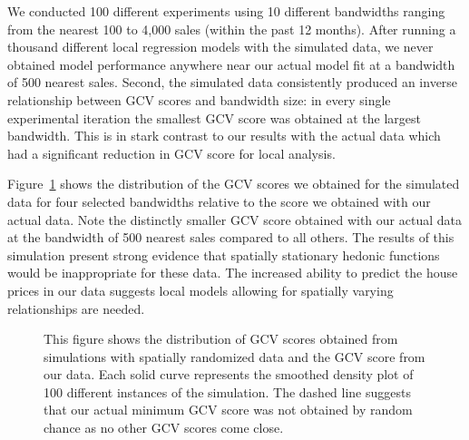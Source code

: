\documentclass{article}\usepackage{graphicx, color}
\begin{document}
We conducted 100 different experiments using 10 different bandwidths ranging from the nearest 100 to 4,000 sales (within the past 12 months). After running a thousand different local regression models with the simulated data, we never obtained model performance anywhere near our actual model fit at a bandwidth of 500 nearest sales. Second, the simulated data consistently produced an inverse relationship between GCV scores and bandwidth size: in every single experimental iteration the smallest GCV score was obtained at the largest bandwidth. This is in stark contrast to our results with the actual data which had a significant reduction in GCV score for local analysis.

Figure~\ref{fig:GCVSIM} shows the distribution of the GCV scores we obtained for the simulated data for four selected bandwidths relative to the score we obtained with our actual data. Note the distinctly smaller GCV score obtained with our actual data at the bandwidth of 500 nearest sales compared to all others. The results of this simulation present strong evidence that spatially stationary hedonic functions would be inappropriate for these data. The increased ability to predict the house prices in our data suggests local models allowing for spatially varying relationships are needed. 

\begin{figure}
 \caption{This figure shows the distribution of GCV scores obtained from simulations with spatially randomized data and the GCV score from our data. Each solid curve represents the smoothed density plot of 100 different instances of the simulation. The dashed line suggests that our actual minimum GCV score was not obtained by random chance as no other GCV scores come close.}
 \label{fig:GCVSIM}
\end{figure}
\end{document}

